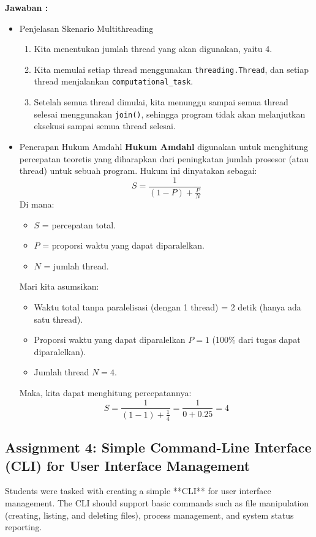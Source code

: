 \documentclass[12pt]{article}
\begin{document}
\textbf{Jawaban : }
\begin{itemize}
    \item Penjelasan Skenario Multithreading
        \begin{enumerate}
            \item Kita menentukan jumlah thread yang akan digunakan, yaitu 4.
            \item Kita memulai setiap thread menggunakan \texttt{threading.Thread}, dan setiap thread menjalankan \texttt{computational\_task}.
            \item Setelah semua thread dimulai, kita menunggu sampai semua thread selesai menggunakan \texttt{join()}, sehingga program tidak akan melanjutkan eksekusi sampai semua thread selesai.
        \end{enumerate}
    \item Penerapan Hukum Amdahl
        \textbf{Hukum Amdahl} digunakan untuk menghitung percepatan teoretis yang diharapkan dari peningkatan jumlah prosesor (atau thread) untuk sebuah program. Hukum ini dinyatakan sebagai:
        \begin{equation}
            S = \frac{1}{(1 - P) + \frac{P}{N}}
        \end{equation}
        Di mana:
        \begin{itemize}
            \item \( S \) = percepatan total.
            \item \( P \) = proporsi waktu yang dapat diparalelkan.
            \item \( N \) = jumlah thread.
        \end{itemize}

        Mari kita asumsikan:
        \begin{itemize}
            \item Waktu total tanpa paralelisasi (dengan 1 thread) = 2 detik (hanya ada satu thread).
            \item Proporsi waktu yang dapat diparalelkan \( P = 1 \) (100\% dari tugas dapat diparalelkan).
            \item Jumlah thread \( N = 4 \).
        \end{itemize}
        Maka, kita dapat menghitung percepatannya:
\begin{equation}
S = \frac{1}{(1 - 1) + \frac{1}{4}} = \frac{1}{0 + 0.25} = 4
\end{equation}
\end{itemize}


\subsection{Assignment 4: Simple Command-Line Interface (CLI) for User Interface Management}
Students were tasked with creating a simple **CLI** for user interface management. The CLI should support basic commands such as file manipulation (creating, listing, and deleting files), process management, and system status reporting.
\end{document}
